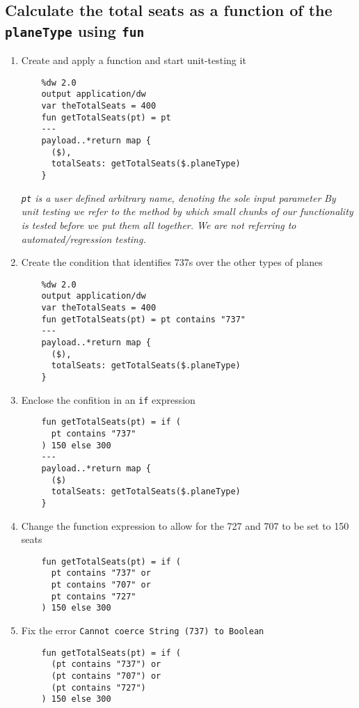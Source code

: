 \subsection{Calculate the total seats as a function of the \texttt{planeType} using \texttt{fun}}
\begin{enumerate}[resume*]
\item Create and apply a function and start unit-testing it
  \begin{lstlisting}
    %dw 2.0
    output application/dw
    var theTotalSeats = 400
    fun getTotalSeats(pt) = pt
    ---
    payload..*return map {
      ($),
      totalSeats: getTotalSeats($.planeType)
    }
  \end{lstlisting}
  \emph{
    \texttt{pt} is a user defined arbitrary name, denoting the sole input parameter
  }
  \newline
  \emph{
    By unit testing we refer to the method by which small chunks of our functionality is tested before we put them all together.  We are not referring to automated/regression testing.
  }
\item Create the condition that identifies 737s over the other types of planes
  \begin{lstlisting}
    %dw 2.0
    output application/dw
    var theTotalSeats = 400
    fun getTotalSeats(pt) = pt contains "737"
    ---
    payload..*return map {
      ($),
      totalSeats: getTotalSeats($.planeType)
    }
  \end{lstlisting}
\item Enclose the confition in an \texttt{if} expression
  \begin{lstlisting}
    fun getTotalSeats(pt) = if (
      pt contains "737"
    ) 150 else 300
    ---
    payload..*return map {
      ($)
      totalSeats: getTotalSeats($.planeType)
    }
  \end{lstlisting}
\item Change the function expression to allow for the 727 and 707 to be set to 150 seats
  \begin{lstlisting}
    fun getTotalSeats(pt) = if (
      pt contains "737" or
      pt contains "707" or
      pt contains "727"
    ) 150 else 300
  \end{lstlisting}
\item Fix the error \texttt{Cannot coerce String (737) to Boolean}
  \begin{lstlisting}
    fun getTotalSeats(pt) = if (
      (pt contains "737") or
      (pt contains "707") or
      (pt contains "727")
    ) 150 else 300

\end{lstlisting}
\end{enumerate}
